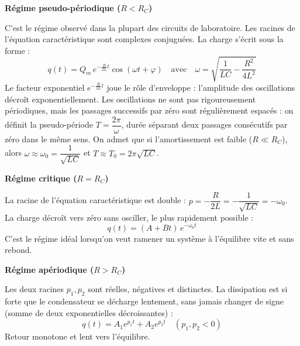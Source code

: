 \documentclass[11pt]{article}
\newcommand{\cle}[1]{{\popxbold\color{popdark}#1}}
\begin{document}
\textbf{Régime pseudo-périodique ($R < R_C$)}\par

C'est le régime observé dans la plupart des circuits de laboratoire. Les racines de l'équation caractéristique sont complexes conjuguées. La charge s'écrit sous la forme :
\[ q(t) = Q_m\,e^{-\frac{R}{2L}t}\cos(\omega t + \varphi) \quad \text{avec} \quad \omega = \sqrt{\frac{1}{LC} - \frac{R^2}{4L^2}} \]
Le facteur exponentiel $e^{-\frac{R}{2L}t}$ joue le rôle d'\cle{enveloppe} : l'amplitude des oscillations décroît exponentiellement. Les oscillations ne sont pas rigoureusement périodiques, mais les passages successifs par zéro sont régulièrement espacés : on définit la \cle{pseudo-période} $T = \dfrac{2\pi}{\omega}$, durée séparant deux passages consécutifs par zéro dans le même sens. On admet que si l'amortissement est faible ($R \ll R_C$), alors $\omega \approx \omega_0 = \dfrac{1}{\sqrt{LC}}$ et $T \approx T_0 = 2\pi\sqrt{LC}$.

\textbf{Régime critique ($R = R_C$)}\par

La racine de l'équation caractéristique est double : $p = -\dfrac{R}{2L} = -\dfrac{1}{\sqrt{LC}} = -\omega_0$. La charge décroît vers zéro sans osciller, le plus rapidement possible :
\[ q(t) = (A + Bt)\,e^{-\omega_0 t} \]
C'est le régime idéal lorsqu'on veut ramener un système à l'équilibre vite et sans rebond.

\textbf{Régime apériodique ($R > R_C$)}\par

Les deux racines $p_1, p_2$ sont réelles, négatives et distinctes. La dissipation est si forte que le condensateur se décharge lentement, sans jamais changer de signe (somme de deux exponentielles décroissantes) :
\[ q(t) = A_1 e^{p_1 t} + A_2 e^{p_2 t} \quad (p_1, p_2 < 0) \]
Retour monotone et lent vers l'équilibre.
\end{document}
